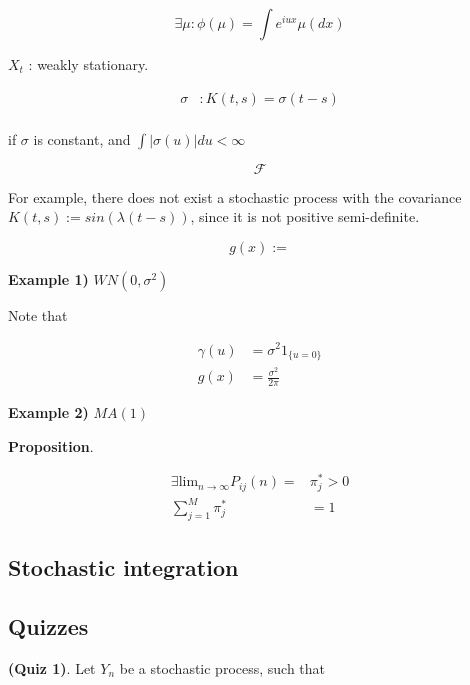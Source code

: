 \documentclass[12pt]{article}
\theoremstyle{nonumberbreak}
\begin{document}
$$
\exists \mu: \phi(\mu) = \int e^{iux} \mu (dx)
$$






$X_t$ : weakly stationary. 

$$
\begin{aligned}
\sigma &: K(t,s) = \sigma(t-s) \\[8pt]
\end{aligned}
$$

if $\sigma$ is constant, and $\int |\sigma (u)| du < \infty $ 

$$
\mathcal{F}
$$


For example, there does not exist a stochastic process with the covariance $K(t,s) := sin( \lambda (t-s) )$, since it is not positive semi-definite.


$$
g(x) := 
$$


\textbf{Example 1)} $WN(0, \sigma^2)$

Note that 

$$
\begin{aligned}
\gamma(u) &= \sigma^2 1_{\{ u = 0 \}} \\[8pt]
g(x) &= \frac{\sigma^2}{2\pi}
\end{aligned}
$$



\textbf{Example 2)} $MA(1)$



\begin{theorem}
\textbf{Proposition}. 

$$
\begin{aligned}
\exists \mathrm{lim}_{n\to\infty} P_{ij}(n) =& \pi_j^\ast > 0 \\[8pt]
\sum_{j=1}^M \pi_j^\ast &= 1
\end{aligned}
$$

\end{theorem}





\subsection{Stochastic integration}






\subsection*{Quizzes}

\textbf{(Quiz 1)}. Let $Y_n$ be a stochastic process, such that
\end{document}

